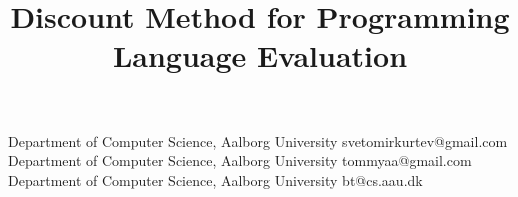 \documentclass[preprint,10pt]{sigplanconf}
\begin{document}
\setlength{\pdfpageheight}{\paperheight}
\setlength{\pdfpagewidth}{\paperwidth}




\title{Discount Method for Programming Language Evaluation}

           {Department of Computer Science, Aalborg University}
           {svetomirkurtev@gmail.com}
           {Department of Computer Science, Aalborg University}
           {tommyaa@gmail.com}
           {Department of Computer Science, Aalborg University}
           {bt@cs.aau.dk}          

\maketitle
\end{document}
